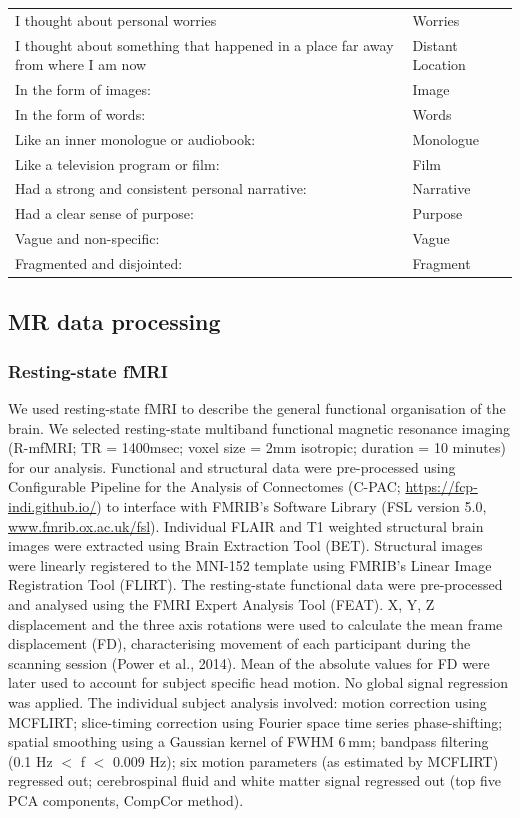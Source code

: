 \begin{table}
{\begin{tabular}{ l l}
I thought about personal worries&Worries\\
I thought about something that happened in a place far away from where I am now&Distant Location\\
In the form of images:&Image\\
In the form of words:&Words\\
Like an inner monologue or audiobook:&Monologue\\
Like a television program or film:&Film\\
Had a strong and consistent personal narrative:&Narrative\\
Had a clear sense of purpose:&Purpose\\
Vague and non-specific:&Vague\\
Fragmented and disjointed:&Fragment\\
\bottomrule
\end{tabular}
}
\end{table}

\linespacenormal
\subsection{MR data processing}
\label{study2:method:MRI}

\subsubsection{Resting-state fMRI} 
We used resting-state fMRI to describe the general functional organisation of the brain. We selected resting-state multiband functional magnetic resonance imaging (R-mfMRI;  TR = 1400msec; voxel size = 2mm isotropic; duration = 10 minutes) for our analysis. Functional and structural data were pre-processed using Configurable Pipeline for the Analysis of Connectomes (C-PAC; \url{https://fcp-indi.github.io/}) to interface with FMRIB’s Software Library (FSL version 5.0, \url{www.fmrib.ox.ac.uk/fsl}). Individual FLAIR and T1 weighted structural brain images were extracted using Brain Extraction Tool (BET). Structural images were linearly registered to the MNI-152 template using FMRIB's Linear Image Registration Tool (FLIRT). The resting-state functional data were pre-processed and analysed using the FMRI Expert Analysis Tool (FEAT). X, Y, Z displacement and the three axis rotations were used to calculate the mean frame displacement (FD), characterising movement of each participant during the scanning session (Power et al., 2014). Mean of the absolute values for FD were later used to account for subject specific head motion. No global signal regression was applied. The individual subject analysis involved: motion correction using MCFLIRT; slice-timing correction using Fourier space time series phase-shifting; spatial smoothing using a Gaussian kernel of FWHM 6 mm; bandpass filtering (0.1 Hz $<$ f $<$ 0.009 Hz); six motion parameters (as estimated by MCFLIRT) regressed out; cerebrospinal fluid and white matter signal regressed out (top five PCA components, CompCor method). 

